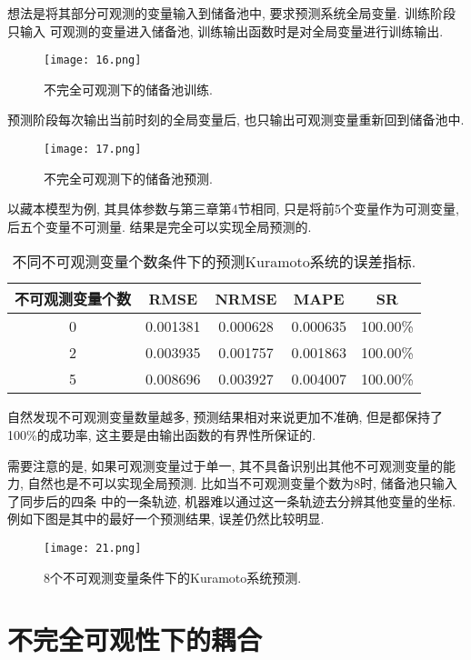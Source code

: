 \documentclass[notitlepage,cs4size,punct,oneside]{ctexrep}
\numberwithin{equation}{chapter}
\theoremstyle{mystyle}
\begin{document}
想法是将其部分可观测的变量输入到储备池中, 要求预测系统全局变量. 训练阶段只输入
可观测的变量进入储备池, 训练输出函数时是对全局变量进行训练输出. 
\begin{figure}[htbp]
    \centering
    \texttt{[image: 16.png]}
    \caption{不完全可观测下的储备池训练.}
\end{figure}

预测阶段每次输出当前时刻的全局变量后, 也只输出可观测变量重新回到储备池中. 
\begin{figure}[htbp]
    \centering
    \texttt{[image: 17.png]}
    \caption{不完全可观测下的储备池预测.}
\end{figure}

以藏本模型为例, 其具体参数与第三章第4节相同, 只是将前5个变量作为可测变量, 
后五个变量不可测量. 结果是完全可以实现全局预测的. 
\noindent\begin{table}[htbp]\centering
    \caption{不同不可观测变量个数条件下的预测Kuramoto系统的误差指标.}
    \begin{tabular}{ccccc}
    \hline\hline
    不可观测变量个数 & RMSE & NRMSE & MAPE & SR \\
    \hline
    0   & 0.001381 & 0.000628 & 0.000635 & 100.00\% \\
    2   & 0.003935 & 0.001757 & 0.001863 & 100.00\% \\
    5   & 0.008696 & 0.003927 & 0.004007 & 100.00\% \\
    \hline\hline
    \end{tabular}
\end{table}

自然发现不可观测变量数量越多, 预测结果相对来说更加不准确, 但是都保持了100\%的成功率, 
这主要是由输出函数的有界性所保证的. 

需要注意的是, 如果可观测变量过于单一, 其不具备识别出其他不可观测变量的能力, 
自然也是不可以实现全局预测. 比如当不可观测变量个数为8时, 储备池只输入了同步后的四条
中的一条轨迹, 机器难以通过这一条轨迹去分辨其他变量的坐标. 例如下图是其中的最好一个预测结果, 
误差仍然比较明显. 
\begin{figure}[htbp]
    \centering
    \texttt{[image: 21.png]}
    \caption{8个不可观测变量条件下的Kuramoto系统预测.}
\end{figure}

\clearpage

\section{不完全可观性下的耦合}
\end{document}
